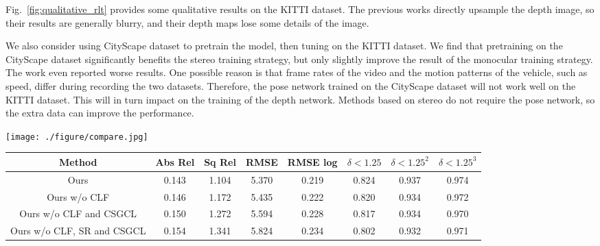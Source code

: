 \documentclass[10pt,twocolumn,letterpaper]{article}
\begin{document}
Fig.~\ref{fig:qualitative_rlt} provides some qualitative results on the KITTI dataset. The previous works directly upsample the depth image, so their results are generally blurry, and their depth maps lose some details of the image.  

We also consider using CityScape dataset \cite{cityscapes} to pretrain the model, then tuning on the KITTI dataset. We find that pretraining on the CityScape dataset significantly benefits the stereo training  strategy, but only slightly improve the result of the monocular training strategy. The work \cite{yin2018geonet} even reported worse results. One possible reason is that frame rates of the video and the motion patterns of the vehicle, such as speed, differ during recording the two datasets. Therefore, the pose network trained on the CityScape dataset will not work well on the KITTI dataset. This will in turn impact on the training of the depth network. Methods based on stereo do not require the pose network, so the extra data can improve the performance.

\begin{figure*}
	\centering
	\texttt{[image: ./figure/compare.jpg]}	
	\caption{Qualitative results on test images from the KITTI Eigen split.} 
	\label{fig:qualitative_rlt}
\end{figure*}

\begin{table*}
	\small
	\begin{center}
		\begin{tabular}{ c|c|c|c|c|c|c|c}
			\hline
			Method    & Abs Rel & Sq Rel & RMSE & RMSE log & $\delta  < 1.25$ & $\delta  < 1.25^2$ &  $\delta  < 1.25^3$\\
			\hline\hline
			Ours                            & 0.143 & 1.104 & 5.370 & 0.219 & 0.824 & 0.937& 0.974  \\
			Ours w/o CLF                    	& 0.146 & 1.172 & 5.435 & 0.222 & 0.820 & 0.934 & 0.972 \\
			Ours w/o CLF and CSGCL            & 0.150 & 1.272 & 5.594 & 0.228 & 0.817 & 0.934 & 0.970 \\ 
			Ours w/o CLF, SR and CSGCL        & 0.154 & 1.341 & 5.824 & 0.234 & 0.802 & 0.932 & 0.971 \\
			\hline
		\end{tabular}
	\end{center}
	\caption{ Ablation study of our algorithm on the KITTI dataset \cite{KITTI}  using the split of Eigen \etal \cite{EigenDepth}. Depths are  capped at 80m. CLF, SR and CSGCL represent clip loss function, super-resolution and cross-sequence geometric consistency loss, respectively. The input resolution is $128 \times 416$ pixels.} \label{table:ablation} %
\end{table*}
\end{document}
